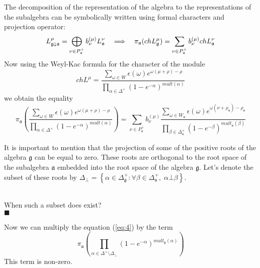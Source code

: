 \documentclass[a4paper,12pt]{article}
\theoremstyle{definition} \newtheorem{Def}{Definition}
\newenvironment{comment}
{\par\noindent{\bf TODO}\\}
{\\\hfill$\scriptstyle\blacksquare$\par}
\begin{document}
The decomposition of the representation of the algebra to the representations of the subalgebra can be symbolically written using formal characters and projection operator:
\begin{equation}
  \label{eq:3}
  L_{\frak{g}\downarrow \frak{a}}^{\mu }=\bigoplus\limits_{\nu \in P_{\frak{a}%
    }^{+}}b_{\nu }^{\left( \mu \right) }L_{\frak{a}}^{\nu }\quad
  \Longrightarrow\quad
  \pi_{\mathfrak{a}}(ch L^{\mu}_{\mathfrak{g}})=\sum_{\nu\in P^{+}_{\mathfrak{a}}}b^{(\mu)}_{\nu} ch L^{\nu}_{\mathfrak{a}}
\end{equation}
Now using the Weyl-Kac formula for the character of the module
\begin{equation}
  \label{eq:2}
  ch L^{\mu}=\frac{\sum_{\omega\in W} \epsilon(\omega) e^{\omega(\mu+\rho)-\rho}}{\prod_{\alpha\in\Delta^{+}}(1-e^{-\alpha})^{mult(\alpha)}}
\end{equation}
we obtain the equality
\begin{equation}
  \label{eq:4}
  \pi_{\mathfrak{a}}\left(\frac{\sum_{\omega\in W} \epsilon(\omega) e^{\omega(\mu+\rho)-\rho}}{\prod_{\alpha\in\Delta^{+}}(1-e^{-\alpha})^{mult(\alpha)}}\right) = 
  \sum_{\nu\in P^{+}_{\mathfrak{a}}}b^{(\mu)}_{\nu}
  \frac{\sum_{\omega\in W_{\mathfrak{a}}}\epsilon(\omega)e^{\omega(\nu+\rho_{\mathfrak{a}})-\rho_{\mathfrak{a}}}}{\prod_{\beta\in \Delta_{\mathfrak{a}}^{+}}(1-e^{-\beta})^{mult_{\mathfrak{a}}(\beta)}}
\end{equation}

It is important to mention that the projection of some of the positive roots of the algebra $\mathfrak{g}$ can be equal to zero. These roots are orthogonal to the root space of the subalgebra $\mathfrak{a}$ embedded into the root space of the algebra $\mathfrak{g}$. Let's denote the subset of these roots by $\Delta_{\bot}=\left\{\alpha\in\Delta_{\mathfrak{g}}^{+}:\forall \beta\in \Delta_{\mathfrak{a}}^{+},\; \alpha\bot\beta \right\}$.

\begin{comment}
  When such a subset does exist?  
\end{comment}

Now we can multiply the equation (\ref{eq:4}) by the term
\begin{equation}
  \label{eq:5}
  \pi_{\mathfrak{a}}\left(\prod_{\alpha\in \Delta^{+}\setminus \Delta_{\bot}}(1-e^{-\alpha})^{mult_{\mathfrak{g}}(\alpha)} \right)
\end{equation}
This term is non-zero. 
\end{document}
